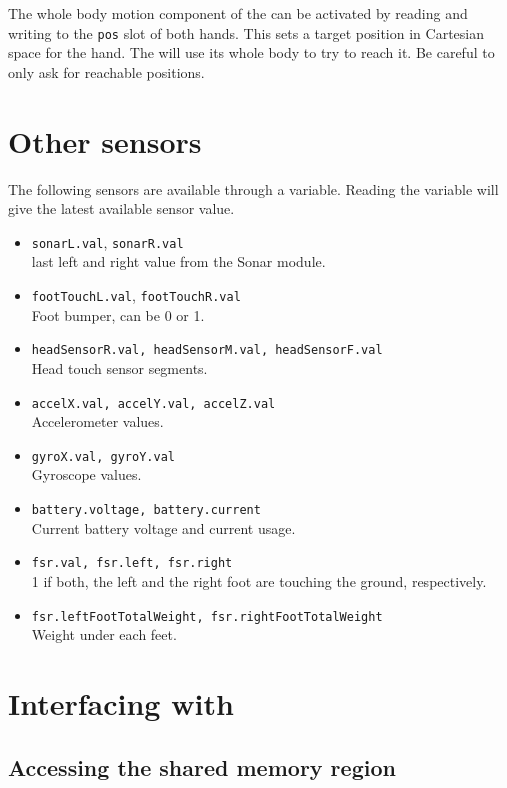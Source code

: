 The whole body motion component of the \naoqi can be activated by reading and
writing to the \lstinline|pos| slot of both hands. This sets a target
position in Cartesian space for the hand. The \naoqi will use its whole body
to try to reach it. Be careful to only ask for reachable positions.

\section{Other sensors}

The following sensors are available through a \us variable.
Reading the variable will give the latest available sensor value.

\begin{itemize}
\item \lstinline|sonarL.val|, \lstinline|sonarR.val| \\
    last left and right value from the Sonar module.
\item \lstinline|footTouchL.val|, \lstinline|footTouchR.val| \\
    Foot bumper, can be 0 or 1.
\item \lstinline|headSensorR.val, headSensorM.val, headSensorF.val| \\
    Head touch sensor segments.
\item \lstinline|accelX.val, accelY.val, accelZ.val| \\
    Accelerometer values.
\item \lstinline|gyroX.val, gyroY.val| \\
    Gyroscope values.
\item \lstinline|battery.voltage, battery.current| \\
    Current battery voltage and current usage.
\item \lstinline|fsr.val, fsr.left, fsr.right| \\
    1 if both, the left and the right foot are touching the ground, respectively.
\item \lstinline|fsr.leftFootTotalWeight, fsr.rightFootTotalWeight| \\
    Weight under each feet.
\end{itemize}

\section{Interfacing with \naoqi}

\subsection{Accessing the \naoqi shared memory region}

